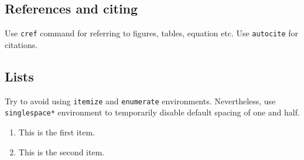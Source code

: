 \subsection{References and citing}

Use \verb|cref| command for referring to figures, tables, equation etc. Use \verb|autocite| for citations.

\subsection{Lists}

Try to avoid using \texttt{itemize} and \texttt{enumerate} environments. Nevertheless, use \texttt{singlespace*} environment to temporarily disable default spacing of one and half.

\begin{singlespace*}
	\begin{enumerate}
		\item
		This is the first item.
		\item
		This is the second item.
	\end{enumerate}
\end{singlespace*}